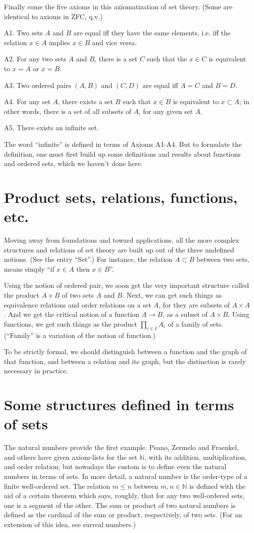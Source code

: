 \documentclass[12pt]{article}
\begin{document}
Finally come the five axioms in this axiomatization of set theory. (Some
are identical to axioms in ZFC, q.v.)

A1. Two sets $A$ and $B$ are equal iff they have the same elements, i.e.
iff the relation $x\in A$ implies $x\in B$ and vice versa.

A2. For any two sets $A$ and $B$, there is a set $C$ such that the
$x\in C$ is equivalent to $x=A$ or $x=B$.

A3. Two ordered pairs $(A,B)$ and $(C,D)$ are equal iff $A=C$ and $B=D$.

A4. For any set $A$, there exists a set $B$ such that $x\in B$ is
equivalent to $x\subset A$; in other words, there is a set of all
subsets of $A$, for any given set $A$.

A5. There exists an infinite set.

The word ``infinite'' is defined in terms of Axioms A1-A4. But to formulate
the definition, one must first build up some definitions and results about
functions and ordered sets, which we haven't done here.

\section{Product sets, relations, functions, etc.}
Moving away from foundations and toward applications, all the more complex
structures and relations of set theory are built up
out of the three undefined notions. (See the entry ``Set''.) For instance,
the relation $A\subset B$ between two sets, means simply
``if $x\in A$ then $x\in B$''.

Using the notion of ordered pair, we soon get the very important structure
called the product $A\times B$ of two sets $A$ and $B$. Next, we can get such
things as equivalence relations and order relations on a set $A$, for they
are subsets of $A\times A$. And we get the critical notion of a function
$A\to B$, as a subset of $A\times B$. Using functions, we get such things
as the product $\prod_{i\in I}A_i$ of a family of sets. (``Family'' is a
variation of the notion of function.)

To be strictly formal, we should distinguish between a function and the
graph of that function, and between a relation and its graph, but the
distinction is rarely necessary in practice.

\section{Some structures defined in terms of sets}
The natural numbers provide the first example. Peano, Zermelo and Fraenkel,
and others have given axiom-lists for the set $\mathbb{N}$, with its
addition, multiplication, and order relation; but
nowadays the custom is to define even the natural numbers in terms of
sets. In more detail, a natural number is the order-type of a finite
well-ordered set.
The relation $m\le n$ between $m,n\in \mathbb{N}$
is defined with the aid of a certain theorem which says, roughly, that
for any two well-ordered sets, one is a segment of the other.
The sum or product of two natural numbers is defined as the cardinal
of the sum or product, respectively, of two sets. (For an extension of
this idea, see surreal numbers.)
\end{document}
